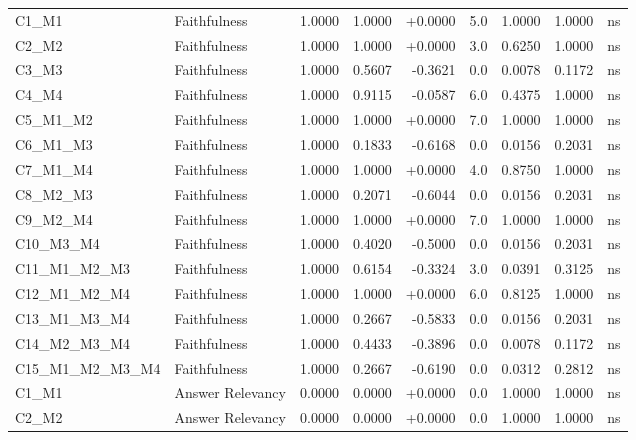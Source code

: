 \begin{table}[p]
\begin{tabular*}{\textwidth}{@{\extracolsep{\fill}} l l r r r r r r c @{}}
\addlinespace
C1\_M1          & Faithfulness         & 1.0000 & 1.0000 & +0.0000 & 5.0 & 1.0000 & 1.0000 & ns \\
\addlinespace
C2\_M2          & Faithfulness         & 1.0000 & 1.0000 & +0.0000 & 3.0 & 0.6250 & 1.0000 & ns \\
\addlinespace
C3\_M3          & Faithfulness         & 1.0000 & 0.5607 & -0.3621 & 0.0 & 0.0078 & 0.1172 & ns \\
\addlinespace
C4\_M4          & Faithfulness         & 1.0000 & 0.9115 & -0.0587 & 6.0 & 0.4375 & 1.0000 & ns \\
\addlinespace
C5\_M1\_M2      & Faithfulness         & 1.0000 & 1.0000 & +0.0000 & 7.0 & 1.0000 & 1.0000 & ns \\
\addlinespace
C6\_M1\_M3      & Faithfulness         & 1.0000 & 0.1833 & -0.6168 & 0.0 & 0.0156 & 0.2031 & ns \\
\addlinespace
C7\_M1\_M4      & Faithfulness         & 1.0000 & 1.0000 & +0.0000 & 4.0 & 0.8750 & 1.0000 & ns \\
\addlinespace
C8\_M2\_M3      & Faithfulness         & 1.0000 & 0.2071 & -0.6044 & 0.0 & 0.0156 & 0.2031 & ns \\
\addlinespace
C9\_M2\_M4      & Faithfulness         & 1.0000 & 1.0000 & +0.0000 & 7.0 & 1.0000 & 1.0000 & ns \\
\addlinespace
C10\_M3\_M4     & Faithfulness         & 1.0000 & 0.4020 & -0.5000 & 0.0 & 0.0156 & 0.2031 & ns \\
\addlinespace
C11\_M1\_M2\_M3 & Faithfulness         & 1.0000 & 0.6154 & -0.3324 & 3.0 & 0.0391 & 0.3125 & ns \\
\addlinespace
C12\_M1\_M2\_M4 & Faithfulness         & 1.0000 & 1.0000 & +0.0000 & 6.0 & 0.8125 & 1.0000 & ns \\
\addlinespace
C13\_M1\_M3\_M4 & Faithfulness         & 1.0000 & 0.2667 & -0.5833 & 0.0 & 0.0156 & 0.2031 & ns \\
\addlinespace
C14\_M2\_M3\_M4 & Faithfulness         & 1.0000 & 0.4433 & -0.3896 & 0.0 & 0.0078 & 0.1172 & ns \\
\addlinespace
C15\_M1\_M2\_M3\_M4 & Faithfulness         & 1.0000 & 0.2667 & -0.6190 & 0.0 & 0.0312 & 0.2812 & ns \\
\addlinespace
C1\_M1          & Answer Relevancy     & 0.0000 & 0.0000 & +0.0000 & 0.0 & 1.0000 & 1.0000 & ns \\
\addlinespace
C2\_M2          & Answer Relevancy     & 0.0000 & 0.0000 & +0.0000 & 0.0 & 1.0000 & 1.0000 & ns \\

\end{tabular*}
\end{table}
